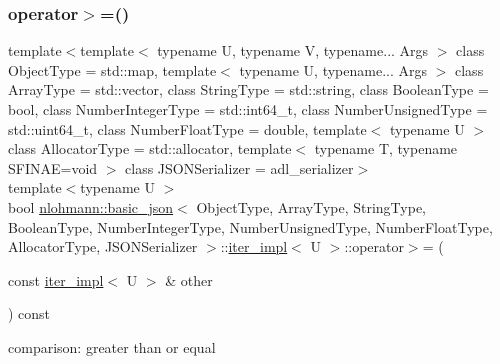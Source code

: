 \subsubsection{\texorpdfstring{operator$>$=()}{operator>=()}}
{\footnotesize\ttfamily template$<$template$<$ typename U, typename V, typename... Args $>$ class Object\+Type = std\+::map, template$<$ typename U, typename... Args $>$ class Array\+Type = std\+::vector, class String\+Type  = std\+::string, class Boolean\+Type  = bool, class Number\+Integer\+Type  = std\+::int64\+\_\+t, class Number\+Unsigned\+Type  = std\+::uint64\+\_\+t, class Number\+Float\+Type  = double, template$<$ typename U $>$ class Allocator\+Type = std\+::allocator, template$<$ typename T, typename S\+F\+I\+N\+A\+E=void $>$ class J\+S\+O\+N\+Serializer = adl\+\_\+serializer$>$ \\
template$<$typename U $>$ \\
bool \mbox{\hyperlink{classnlohmann_1_1basic__json}{nlohmann\+::basic\+\_\+json}}$<$ Object\+Type, Array\+Type, String\+Type, Boolean\+Type, Number\+Integer\+Type, Number\+Unsigned\+Type, Number\+Float\+Type, Allocator\+Type, J\+S\+O\+N\+Serializer $>$\+::\mbox{\hyperlink{classnlohmann_1_1basic__json_1_1iter__impl}{iter\+\_\+impl}}$<$ U $>$\+::operator$>$= (\begin{DoxyParamCaption}\item[{const \mbox{\hyperlink{classnlohmann_1_1basic__json_1_1iter__impl}{iter\+\_\+impl}}$<$ U $>$ \&}]{other }\end{DoxyParamCaption}) const\hspace{0.3cm}{\ttfamily [inline]}}



comparison\+: greater than or equal 

